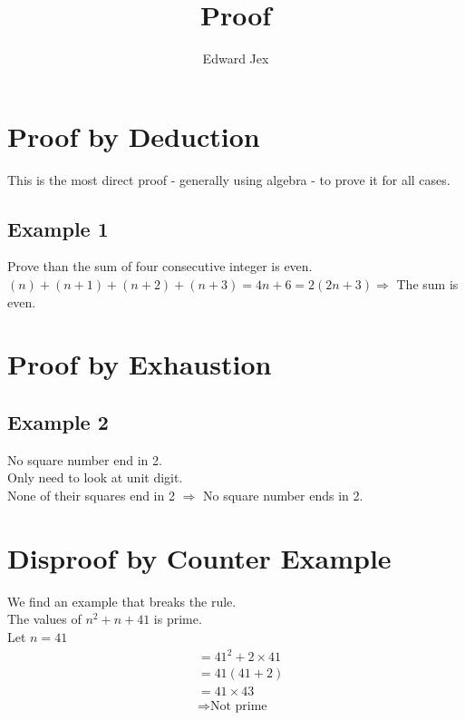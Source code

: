 \documentclass[a4paper,12pt]{article}
\begin{document}
\title{Proof}	
\author{Edward Jex}
\maketitle
\section*{Proof by Deduction}
This is the most direct proof - generally using algebra - to prove it for all cases. \\
\subsection*{Example 1}
Prove than the sum of four consecutive integer is even. \\
$(n) + (n+1) + (n+2) + (n+3) = 4n + 6 = 2(2n + 3) \Rightarrow$ The sum is even. \\
\section*{Proof by Exhaustion}
\subsection*{Example 2}
No square number end in 2. \\
Only need to look at unit digit. \\
None of their squares end in 2 $\Rightarrow$ No square number ends in 2. \\
\section*{Disproof by Counter Example}
We find an example that breaks the rule. \\
The values of $n^2 + n + 41$ is prime. \\
Let $n = 41$ \\
\begin{align*}
& = 41^2 + 2 \times 41 \\
& = 41(41 + 2) \\
& = 41 \times 43 \\
& \Rightarrow \text{Not prime}
\end{align*}
\end{document}
